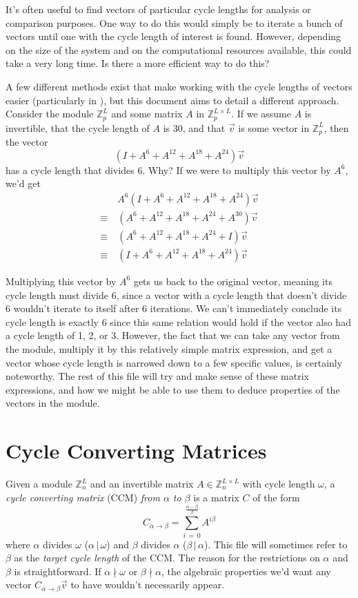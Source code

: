 \documentclass[a4paper, 12pt, reqno]{amsart}
\begin{document}
	It's often useful to find vectors of particular cycle lengths for analysis or comparison purposes. One way to do this would simply be to iterate a bunch of vectors 
	until one with the cycle length of interest is found. However, depending on the size of the system and on the computational resources available, this could take a very 
	long time. Is there a more efficient way to do this?
	
	A few different methods exist that make working with the cycle lengths of vectors easier (particularly in \citet{Patterson2008}), but this document aims to detail a
	different approach. Consider the module $\mathds{Z}_{p}^L$ and some matrix $A$ in $\mathds{Z}_{p}^{L \times L}$. If we assume $A$ is invertible, that the cycle length 
	of $A$ is 30, and that $\vec{v}$ is some vector in $\mathds{Z}_{p}^L$, then the vector
	\[
		(I + A^{6} + A^{12} + A^{18} + A^{24})\vec{v}
	\]
	has a cycle length that divides 6. Why? If we were to multiply this vector by $A^6$, we'd get
	\begin{align*}
		       & \ A^{6}(I + A^{6} + A^{12} + A^{18} + A^{24})\vec{v} \\
		\equiv & \ (A^{6} + A^{12} + A^{18} + A^{24} + A^{30})\vec{v} \\
		\equiv & \ (A^{6} + A^{12} + A^{18} + A^{24} + I)\vec{v}      \\
		\equiv & \ (I + A^{6} + A^{12} + A^{18} + A^{24})\vec{v}
	\end{align*}
	
	Multiplying this vector by $A^6$ gets us back to the original vector, meaning its cycle length must divide 6, since a vector with a cycle length that doesn't divide 6 
	wouldn't iterate to itself after 6 iterations.  We can't immediately conclude its cycle length is exactly 6 since this same relation would hold if the vector also had a 
	cycle length of 1, 2, or 3. However, the fact that we can take any vector from the module, multiply it by this relatively simple matrix expression, and get a vector 
	whose cycle length is narrowed down to a few specific values, is certainly noteworthy. The rest of this file will try and make sense of these matrix expressions, and 
	how we might be able to use them to deduce properties of the vectors in the module.
	
	\section{Cycle Converting Matrices}
	Given a module $\mathds{Z}_{n}^{L}$ and an invertible matrix $A \in \mathds{Z}_{n}^{L \times L}$ with cycle length $\omega$, a \emph{cycle converting matrix} (CCM) 
	\emph{from $\alpha$ to $\beta$} is a matrix $C$ of the form
	\[
		C_{\alpha\rightarrow\beta} = \sum_{i\,=\,0}^{\frac{\alpha-\beta}{\beta}} A^{i\beta}
	\]
	where $\alpha$ divides $\omega$ ($\alpha\,|\,\omega$) and $\beta$ divides $\alpha$ ($\beta\,|\,\alpha$). This file will sometimes refer to $\beta$ as the \emph{target 
	cycle length} of the CCM. The reason for the restrictions on $\alpha$ and $\beta$ is straightforward. If $\alpha \nmid \omega$ or $\beta \nmid \alpha$, the algebraic 
	properties we'd want any vector $C_{\alpha\rightarrow\beta}\vec{v}$ to have wouldn't necessarily appear.
	
\end{document}
